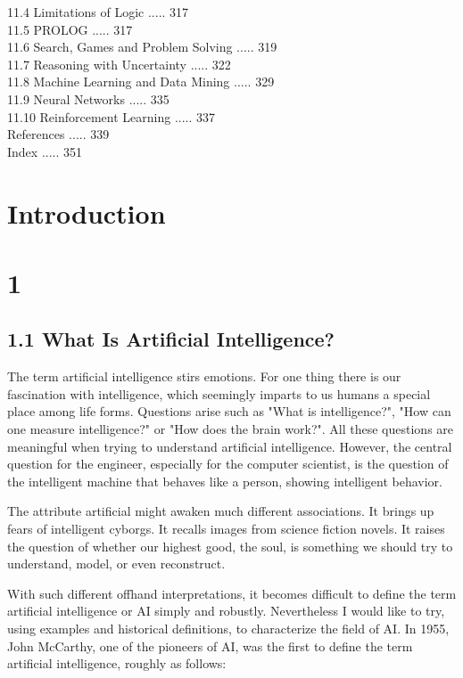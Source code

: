 \documentclass[10pt]{article}
\begin{document}
11.4 Limitations of Logic ..... 317\\
11.5 PROLOG ..... 317\\
11.6 Search, Games and Problem Solving ..... 319\\
11.7 Reasoning with Uncertainty ..... 322\\
11.8 Machine Learning and Data Mining ..... 329\\
11.9 Neural Networks ..... 335\\
11.10 Reinforcement Learning ..... 337\\
References ..... 339\\
Index ..... 351

\section*{Introduction}
\section*{1}
\subsection*{1.1 What Is Artificial Intelligence?}
The term artificial intelligence stirs emotions. For one thing there is our fascination with intelligence, which seemingly imparts to us humans a special place among life forms. Questions arise such as "What is intelligence?", "How can one measure intelligence?" or "How does the brain work?". All these questions are meaningful when trying to understand artificial intelligence. However, the central question for the engineer, especially for the computer scientist, is the question of the intelligent machine that behaves like a person, showing intelligent behavior.

The attribute artificial might awaken much different associations. It brings up fears of intelligent cyborgs. It recalls images from science fiction novels. It raises the question of whether our highest good, the soul, is something we should try to understand, model, or even reconstruct.

With such different offhand interpretations, it becomes difficult to define the term artificial intelligence or AI simply and robustly. Nevertheless I would like to try, using examples and historical definitions, to characterize the field of AI. In 1955, John McCarthy, one of the pioneers of AI, was the first to define the term artificial intelligence, roughly as follows:
\end{document}
